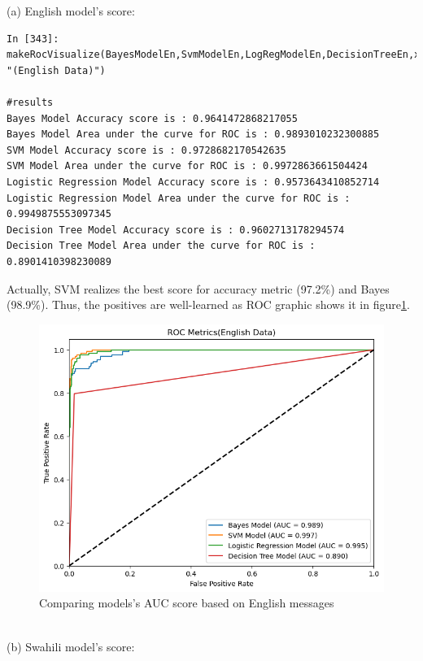 \documentclass[12pt,a4paper, oneside]{book}
\begin{document}
(a) English model's score: 
\begin{lstlisting}[style=stylejupyter]
In [343]: makeRocVisualize(BayesModelEn,SvmModelEn,LogRegModelEn,DecisionTreeEn,x_test_features_en,y_test_en, "(English Data)")

#results 
Bayes Model Accuracy score is : 0.9641472868217055
Bayes Model Area under the curve for ROC is : 0.9893010232300885
SVM Model Accuracy score is : 0.9728682170542635
SVM Model Area under the curve for ROC is : 0.9972863661504424
Logistic Regression Model Accuracy score is : 0.9573643410852714
Logistic Regression Model Area under the curve for ROC is : 0.9949875553097345
Decision Tree Model Accuracy score is : 0.9602713178294574
Decision Tree Model Area under the curve for ROC is : 0.8901410398230089
\end{lstlisting} 
Actually, SVM realizes the best score for accuracy metric (97.2\%) and Bayes (98.9\%). Thus, the positives are well-learned as ROC graphic shows it in figure\ref{fig:rocenglish}.
 \begin{figure}
 	\centering
 	\includegraphics[width=0.9\linewidth]{CollectImages/rocEnglish}
 	\caption{Comparing models's AUC score based on English messages}
 	\label{fig:rocenglish}
 \end{figure}
\\

(b) Swahili model's score:
\end{document}
